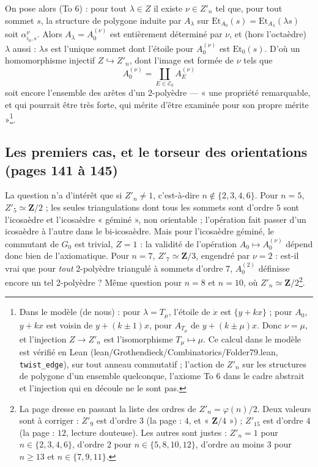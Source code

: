 \documentclass[11pt,a4paper]{article}
\begin{document}
On pose alors (To 6) : pour tout $\lambda \in Z$ il existe $\nu \in Z'_n$ tel
que, pour tout sommet $s$, la structure de polygone induite par $A_\lambda$ sur
$\mathrm{Et}_{A_0}(s) = \mathrm{Et}_{A_\lambda}(\lambda s)$ soit $\alpha_{i_0,
s}^{\nu}$. Alors $A_\lambda = A_0^{(\nu)}$ est entièrement déterminé par $\nu$,
et (hors l'octaèdre) $\lambda$ aussi : $\lambda s$ est l'unique sommet dont
l'étoile pour $A_0^{(\nu)}$ est $\mathrm{Et}_0(s)$. D'où un homomorphisme
injectif $Z \hookrightarrow Z'_n$, dont l'image est formée de $\nu$ tels que
\[
  A_0^{(\nu)} = \coprod_{E \in \mathcal{E}_0} A_E^{(\nu)}
\]
soit encore l'ensemble des arêtes d'un 2-polyèdre --- « une propriété
remarquable, et qui pourrait être très forte, qui mérite d'être examinée pour
son propre mérite »\footnote{Dans le modèle (de nous) : pour $\lambda =
T_\mu$, l'étoile de $\dot x$ est $\{y + kx\}$ ; pour $A_0$, $y + kx$ est voisin
de $y + (k \pm 1)x$, pour $A_{T_\mu}$ de $y + (k \pm \mu)x$. Donc $\nu = \mu$,
et l'injection $Z \to Z'_n$ est l'isomorphisme $T_\mu \mapsto \mu$. Ce
calcul dans le modèle est vérifié en Lean (lean/Grothendieck/Combinatorics/Folder79.lean,
\texttt{twist\_edge}), sur tout anneau commutatif ; l'action de $Z'_n$ sur les
structures de polygone d'un ensemble quelconque, l'axiome To 6 dans le cadre
abstrait et l'injection qui en découle ne le sont pas.}.

\subsection*{Les premiers cas, et le torseur des orientations (pages 141 à 145)}

La question n'a d'intérêt que si $Z'_n \neq 1$, c'est-à-dire $n \notin \{2, 3,
4, 6\}$. Pour $n = 5$, $Z'_5 \simeq \mathbf{Z}/2$ ; les seules triangulations
dont tous les sommets sont d'ordre $5$ sont l'icosaèdre et l'icosaèdre
« géminé », non orientable ; l'opération fait passer d'un icosaèdre à l'autre
dans le bi-icosaèdre. Mais pour l'icosaèdre géminé, le commutant de $G_0$ est
trivial, $Z = 1$ : la validité de l'opération $A_0 \mapsto A_0^{(\nu)}$ dépend
donc bien de l'axiomatique. Pour $n = 7$, $Z'_7 \simeq \mathbf{Z}/3$, engendré
par $\nu = 2$ : est-il vrai que pour \emph{tout} 2-polyèdre triangulé à sommets
d'ordre $7$, $A_0^{(2)}$ définisse encore un tel 2-polyèdre ? Même question pour
$n = 8$ et $n = 10$, où $Z'_n \simeq \mathbf{Z}/2$\footnote{La page dresse en
passant la liste des ordres de $Z'_n = \varphi(n)/2$. Deux valeurs sont à
corriger : $Z'_9$ est d'ordre $3$ (la page : $4$, et « $\mathbf{Z}/4$ ») ; $Z'_{15}$
est d'ordre $4$ (la page : $12$, lecture douteuse). Les autres sont justes :
$Z'_n = 1$ pour $n \in \{2, 3, 4, 6\}$, d'ordre $2$ pour $n \in \{5, 8, 10,
12\}$, d'ordre au moins $3$ pour $n \geq 13$ et $n \in \{7, 9, 11\}$.}.
\end{document}
